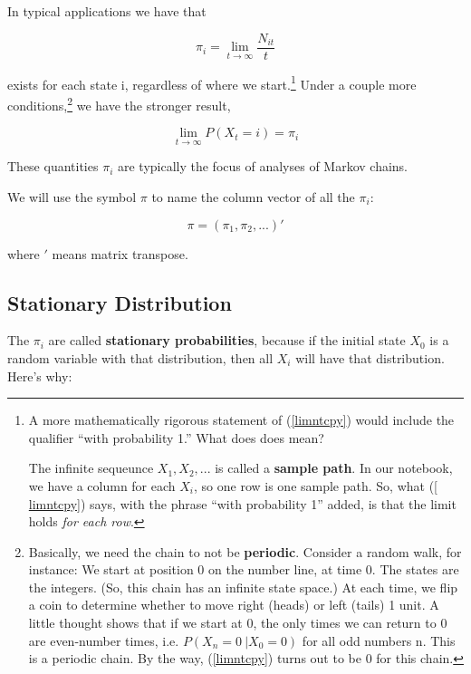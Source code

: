 In typical applications we have that 

\begin{equation} 
\label{limntcpy} 
\pi_{i}=\lim_{t\rightarrow \infty}\frac{N_{it}}{t} 
\end{equation}
                 
exists for each state i, regardless of where we start.\footnote{A more
mathematically rigorous statement of (\ref{limntcpy}) would include the
qualifier ``with probability 1.''  What does does mean?

The infinite sequeunce $X_1, X_2,...$ is called a {\bf sample path}.  In
our notebook, we have a column for each $X_i$, so one row is one sample
path.  So, what (\ref{ limntcpy}) says, with the phrase ``with
probability 1'' added, is that the limit holds {\it for each row}. 
} 
Under a couple
more conditions,\footnote{Basically, we need the chain to not be {\bf
periodic}.  Consider a random walk, for instance:  We start at position
0 on the number line, at time 0.  The states are the integers.  (So,
this chain has an infinite state space.) At each time, we flip a coin to
determine whether to move right (heads) or left (tails) 1 unit.  A
little thought shows that if we start at 0, the only times we can return
to 0 are even-number times, i.e. $P(X_n = 0 ~| X_0 = 0)$ for all odd
numbers n.  This is a periodic chain.  By the way, (\ref{limntcpy})
turns out to be 0 for this chain.} we have the stronger result,

\begin{equation}
\label{limprob}
\lim_{t\rightarrow \infty }P(X_{t}=i)=\pi_{i}
\end{equation}

These quantities $\pi_i$ are typically the focus of analyses of Markov
chains.

We will use the symbol $\pi$ to name the column vector of all the
$\pi_i$:

\begin{equation}
\pi = (\pi_1, \pi_2, ...)'
\end{equation}

where $'$ means matrix transpose.

\subsection{Stationary Distribution}

The $\pi_i$ are called {\bf stationary probabilities}, because if the
initial state $X_0$ is a random variable with that distribution, then
all $X_i$ will have that distribution.  Here's why:

